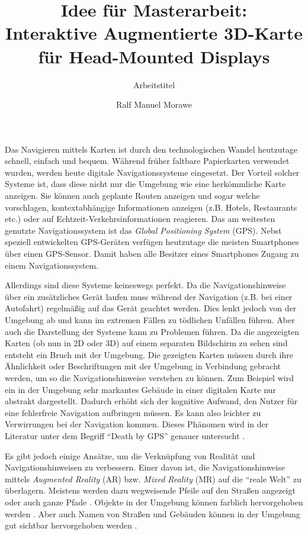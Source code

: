 \documentclass[a4paper]{scrartcl}
\begin{document}
	
\author{Ralf Manuel Morawe}
\title{Idee für Masterarbeit:\\ Interaktive Augmentierte 3D-Karte für Head-Mounted Displays}
\subtitle{Arbeitstitel}
\maketitle

Das Navigieren mittels Karten ist durch den technologischen Wandel heutzutage schnell, einfach und bequem.
Während früher faltbare Papierkarten verwendet wurden, werden heute digitale Navigationssysteme eingesetzt.
Der Vorteil solcher Systeme ist, dass diese nicht nur die Umgebung wie eine herkömmliche Karte anzeigen.
Sie können auch geplante Routen anzeigen und sogar welche vorschlagen, kontextabhängige Informationen anzeigen (z.B. Hotels, Restaurants etc.) oder auf Echtzeit-Verkehrsinformationen reagieren.
Das am weitesten genutzte Navigationssystem ist das \emph{Global Positioning System} (GPS).
Nebst speziell entwickelten GPS-Geräten verfügen heutzutage die meisten Smartphones über einen GPS-Sensor.
Damit haben alle Besitzer eines Smartphones Zugang zu einem Navigationssystem.

Allerdings sind diese Systeme keineswegs perfekt.
Da die Navigationshinweise über ein zusätzliches Gerät laufen muss während der Navigation (z.B. bei einer Autofahrt) regelmäßig auf das Gerät geachtet werden.
Dies lenkt jedoch von der Umgebung ab und kann im extremen Fällen zu tödlichen Unfällen führen.
Aber auch die Darstellung der Systeme kann zu Problemen führen.
Da die angezeigten Karten (ob nun in 2D oder 3D) auf einem separaten Bildschirm zu sehen sind entsteht ein Bruch mit der Umgebung.
Die gezeigten Karten müssen durch ihre Ähnlichkeit oder Beschriftungen mit der Umgebung in Verbindung gebracht werden, um so die Navigationshinweise verstehen zu können.
Zum Beispiel wird ein in der Umgebung sehr markantes Gebäude in einer digitalen Karte nur abstrakt dargestellt.
Dadurch erhöht sich der kognitive Aufwand, den Nutzer für eine fehlerfreie Navigation aufbringen müssen.
Es kann also leichter zu Verwirrungen bei der Navigation kommen.
Dieses Phänomen wird in der Literatur unter dem Begriff \enquote{Death by GPS} genauer untersucht \autocite{Lin2017}.

Es gibt jedoch einige Ansätze, um die Verknüpfung von Realität und Navigationshinweisen zu verbessern.
Einer davon ist, die Navigationshinweise mittels \emph{Augmented Reality} (AR) bzw. \emph{Mixed Reality} (MR) auf die \enquote{reale Welt} zu überlagern.
Meistens werden dazu wegweisende Pfeile auf den Straßen angezeigt \autocites{Bark2014}{Alnabhan2014} oder auch ganze Pfade \autocites{Hoellerer1999}{Reitmayr2004}{Kim2009}.
Objekte in der Umgebung können farblich hervorgehoben werden \autocites{Mulloni2011a}.
Aber auch Namen von Straßen und Gebäuden können in der Umgebung gut sichtbar hervorgehoben werden \autocite[25\psq]{Lodts2015}.
\end{document}
